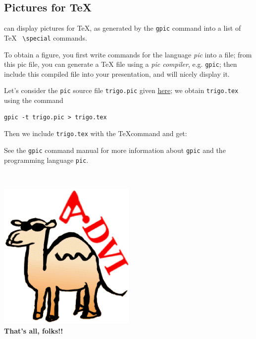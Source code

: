 \documentclass[12pt]{article}
\begin{document}
\newpage

\subsection*{Pictures for \TeX}

{\ActiveDVI} can display pictures for \TeX, as generated by
the \verb"gpic" command into a list of \TeX~ \verb"\special" commands.

\bigskip

To obtain a figure, you first write commands for the language
{\em pic} into a file; from this pic file, you can generate a \TeX
file using a {\em pic compiler}, e.g. \verb"gpic"; then include this
compiled file into your presentation, and {\ActiveDVI} will nicely display it.

Let's consider the \verb"pic" source file \verb"trigo.pic" given
\hyperref{trigo_source.dvi}{}{}{here}; we obtain
\verb"trigo.tex" using the command 
\begin{verbatim}
gpic -t trigo.pic > trigo.tex
\end{verbatim}

Then we include \verb"trigo.tex" with the \TeX command
\verb|| and get:

\def\showgraph{%
  \par\medskip\centerline{\raise 1em\box\graph}\bigskip\noindent\ignorespaces}



See the \verb"gpic" command manual for more information about
\verb"gpic" and the programming language \verb"pic".

\lastpage

~\vfill
\begin{center}
\includegraphics[width=0.5\textwidth]{../tex/advilogo.eps}\\
{\Large \bf That's all, folks!!}
\end{center}
\vfill
\end{document}
